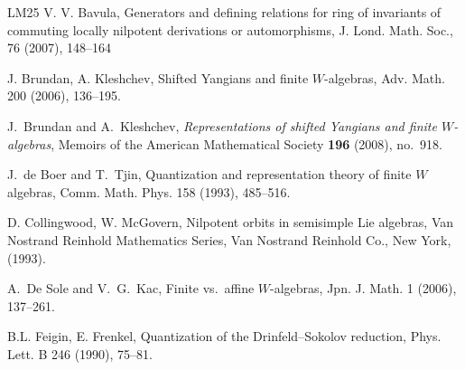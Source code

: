 \documentclass[12pt,a4paper]{amsart}
\numberwithin{equation}{section}
\theoremstyle{definition}
\theoremstyle{remark}
\begin{document}
\begin{thebibliography}{LM25}
  V. V. Bavula, Generators and defining relations for ring of invariants of commuting locally nilpotent derivations or automorphisms, J. Lond. Math. Soc., 76 (2007), 148--164
%




   J. Brundan, A. Kleshchev, Shifted Yangians and finite $W$-algebras, Adv. Math. 200
(2006), 136--195.


J.~Brundan and A.~Kleshchev,
\emph{Representations of shifted Yangians and finite \(W\)-algebras},
Memoirs of the American Mathematical Society
\textbf{196} (2008), no.~918.



%

J.~de Boer and T.~Tjin,
Quantization and representation theory of finite $W$ algebras,
Comm. Math. Phys. 158 (1993), 485--516.

 D. Collingwood, W. McGovern, Nilpotent orbits in semisimple Lie algebras, Van
Nostrand Reinhold Mathematics Series, Van Nostrand Reinhold Co., New York, (1993).



A.~De Sole and V.~G.~Kac,
Finite vs.\ affine $W$-algebras,
Jpn. J. Math. 1 (2006), 137--261.



 B.L. Feigin,  E. Frenkel, Quantization of the Drinfeld--Sokolov reduction, Phys. Lett. B 246 (1990), 75--81.


\end{thebibliography}
\end{document}
